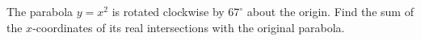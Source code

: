 The parabola $y=x^2$ is rotated clockwise by $67^\circ$ about the origin. Find the sum of the $x$-coordinates of its real intersections with the original parabola.
